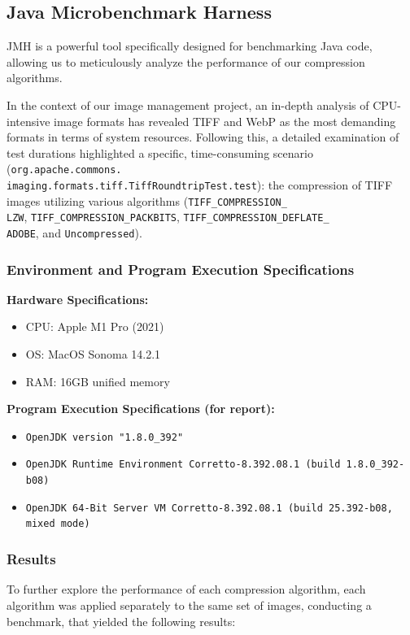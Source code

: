 \documentclass[sigconf]{acmart}
\begin{document}
\subsection{Java Microbenchmark Harness}
JMH\cite{jmh} is a powerful tool specifically designed for benchmarking Java code, allowing us to meticulously analyze the performance of our compression algorithms.

In the context of our image management project, an in-depth analysis of CPU-intensive image formats has revealed TIFF and WebP as the most demanding formats in terms of system resources. Following this, a detailed examination of test durations highlighted a specific, time-consuming scenario (\texttt{org.apache.commons.\\imaging.formats.tiff.TiffRoundtripTest.test}): the compression of TIFF images utilizing various algorithms (\texttt{TIFF\_COMPRESSION\_\\LZW}, \texttt{TIFF\_COMPRESSION\_PACKBITS}, \texttt{TIFF\_COMPRESSION\_DEFLATE\_\\ADOBE}, and \texttt{Uncompressed}).

\subsubsection{Environment and Program Execution Specifications}

\textbf{Hardware Specifications:}
\begin{itemize}
  \item CPU: Apple M1 Pro (2021)
  \item OS: MacOS Sonoma 14.2.1
  \item RAM: 16GB unified memory
\end{itemize}

\textbf{Program Execution Specifications (for report):}
\begin{itemize}
  \item \texttt{OpenJDK version "1.8.0\_392"}
  \item \texttt{OpenJDK Runtime Environment Corretto-8.392.08.1 (build 1.8.0\_392-b08)}
  \item \texttt{OpenJDK 64-Bit Server VM Corretto-8.392.08.1 (build 25.392-b08, mixed mode)}
\end{itemize}

\subsubsection{Results}
To further explore the performance of each compression algorithm, each algorithm was applied separately to the same set of images, conducting a benchmark, that yielded the following results: \vspace{12pt}
\end{document}
